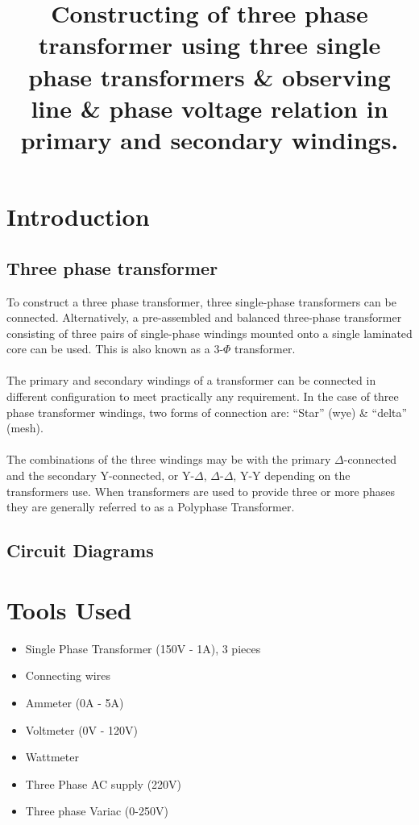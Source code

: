 \documentclass[12pt]{article}
\title{Constructing of three phase transformer using three single phase transformers
\& observing line \& phase voltage relation in primary and
secondary windings.}
\author{}
\date{}
\begin{document}

\pagebreak

\maketitle
\section{Introduction}
\subsection*{Three phase transformer}
To construct a three phase transformer, three single-phase transformers can be connected. Alternatively, a pre-assembled and balanced three-phase transformer consisting of three pairs of single-phase windings mounted onto a single laminated core can be used. This is also known as a 3-$\Phi$ transformer.\\\\
The primary and secondary windings of a transformer can be connected in different configuration to meet practically any requirement. In the case of three phase transformer windings, two forms of connection are: “Star” (wye) \& “delta” (mesh).\\\\
The combinations of the three windings may be with the primary $\Delta$-connected and the secondary Y-connected, or Y-$\Delta$, $\Delta$-$\Delta$, Y-Y depending on the transformers use. When transformers are used to provide three or more phases they are generally referred to as a Polyphase Transformer.\cite{trans}


\pagebreak
\subsection*{Circuit Diagrams}


\section{Tools Used}
\begin{itemize}
    \item Single Phase Transformer (150V - 1A), 3 pieces
    \item Connecting wires
    \item Ammeter (0A - 5A)
    \item Voltmeter (0V - 120V)
    \item Wattmeter
    \item Three Phase AC supply (220V)
    \item Three phase Variac (0-250V)
\end{itemize}
\end{document}
